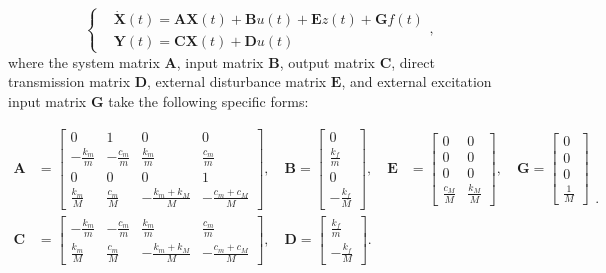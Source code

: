 \documentclass[review]{elsarticle}
\begin{document}
\begin{equation}\label{eq:state_space}
\left\{ \begin{aligned}
& \dot{\mathbf{X}}(t)=\mathbf{A}\mathbf{X}(t)+\mathbf{B}u(t)+\mathbf{E}z(t)+\mathbf{G}f(t) \\
& \mathbf{Y}(t)=\mathbf{C}\mathbf{X}(t)+\mathbf{D}u(t)
\end{aligned} \right.,
\end{equation}
where the system matrix $\mathbf{A}$, input matrix $\mathbf{B}$, output matrix $\mathbf{C}$, direct transmission matrix $\mathbf{D}$, external disturbance matrix $\mathbf{E}$, and external excitation input matrix $\mathbf{G}$ take the following specific forms:

\begin{equation}\label{eq:matrices}
\begin{aligned}
\mathbf{A} &= \begin{bmatrix} 0 & 1 & 0 & 0 \\ -\frac{k_m}{m} & -\frac{c_m}{m} & \frac{k_m}{m} & \frac{c_m}{m} \\ 0 & 0 & 0 & 1 \\ \frac{k_m}{M} & \frac{c_m}{M} & -\frac{k_m + k_M}{M} & -\frac{c_m + c_M}{M} \end{bmatrix},
\quad
\mathbf{B} = \begin{bmatrix} 0 \\ \frac{k_f}{m} \\ 0 \\ -\frac{k_f}{M} \end{bmatrix}, 
\quad
\mathbf{E} &= \begin{bmatrix} 0 & 0 \\ 0 & 0 \\ 0 & 0 \\ \frac{c_M}{M} & \frac{k_M}{M} \end{bmatrix}, 
\quad
\mathbf{G} = \begin{bmatrix} 0 \\ 0 \\ 0 \\ \frac{1}{M} \end{bmatrix}\\[6pt]
\mathbf{C} &= \begin{bmatrix} -\frac{k_m}{m} & -\frac{c_m}{m} & \frac{k_m}{m} & \frac{c_m}{m} \\ \frac{k_m}{M} & \frac{c_m}{M} & -\frac{k_m + k_M}{M} & -\frac{c_m + c_M}{M} \end{bmatrix},
\quad
\mathbf{D} = \begin{bmatrix} \frac{k_f}{m} \\ -\frac{k_f}{M} \end{bmatrix}.\\[6pt]
\end{aligned}.
\end{equation}
\end{document}
